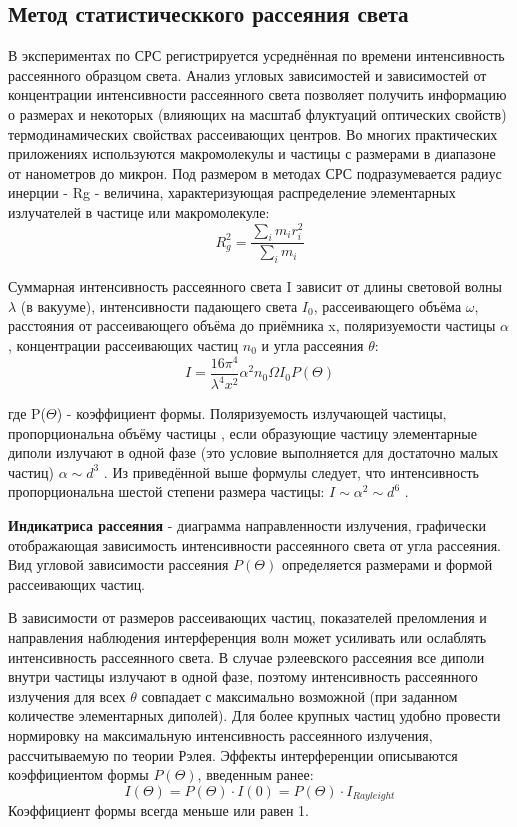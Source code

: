 \documentclass[a4paper,10pt]{article}
\begin{document}
\subsection{ Метод статистическкого рассеяния света}
В экспериментах по СРС регистрируется усреднённая по времени интенсивность рассеянного образцом света. Анализ угловых зависимостей и зависимостей от концентрации
интенсивности рассеянного света позволяет получить информацию о размерах и некоторых (влияющих на масштаб флуктуаций оптических свойств) термодинамических свойствах рассеивающих центров.
Во многих практических приложениях используются макромолекулы и частицы с размерами в диапазоне от нанометров до микрон. Под размером в методах СРС подразумевается радиус инерции - Rg - величина, характеризующая распределение элементарных
излучателей в частице или макромолекуле:
\[ R^2_{g} = \frac{ \sum \limits_{i} m_{i} r^2_{i}}{\sum\limits_{i} m_{i}} \]


Суммарная интенсивность рассеянного света I зависит от длины световой волны $\lambda$
(в вакууме), интенсивности падающего света $I_{0}$, рассеивающего объёма $\omega$, расстояния
от рассеивающего объёма до приёмника x, поляризуемости частицы $\alpha$, концентрации
рассеивающих частиц $n_{0}$ и угла рассеяния $\theta$:
\[I =\frac{16π^4}{\lambda^4x^2 }\alpha^2n_{0}\Omega I_{0} P(\Theta)\]

где P($\Theta$) - коэффициент формы.
Поляризуемость излучающей частицы, пропорциональна объёму частицы , если образующие частицу элементарные диполи излучают в одной фазе (это условие выполняется
для достаточно малых частиц) $\alpha \sim d^3$
. Из приведённой выше формулы следует, что
интенсивность пропорциональна шестой степени размера частицы: $ I \sim \alpha^2 \sim d^6$
.

\textbf{Индикатриса рассеяния} - диаграмма направленности излучения, графически отображающая зависимость интенсивности рассеянного света от угла рассеяния.
Вид угловой зависимости рассеяния $P(\Theta)$ определяется размерами и формой рассеивающих частиц.

В зависимости от размеров рассеивающих частиц, показателей преломления и направления наблюдения интерференция волн может усиливать или ослаблять интенсивность рассеянного света. В случае рэлеевского рассеяния все диполи внутри частицы излучают в одной фазе, поэтому интенсивность рассеянного излучения для всех $\theta$ совпадает с
максимально возможной (при заданном количестве элементарных диполей).
Для более крупных частиц удобно провести нормировку на максимальную интенсивность рассеянного излучения, рассчитываемую по теории Рэлея. Эффекты интерференции описываются коэффициентом формы $P(\Theta)$, введенным ранее:
\[I(\Theta) = P(\Theta) · I(0) = P(\Theta) · I_{Rayleight} \]
Коэффициент формы всегда меньше или равен 1.
\end{document}
